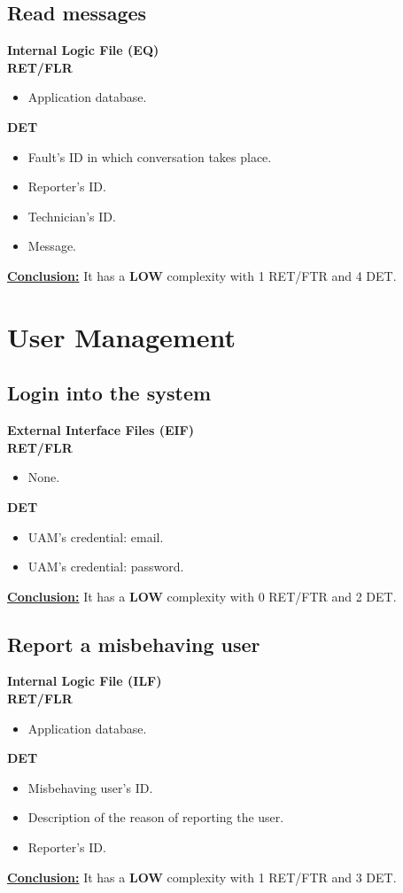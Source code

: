 \subsection{Read messages}
\textbf{Internal Logic File (EQ)} \\ 
\textbf{RET/FLR}
\begin{itemize}
\item Application database.
\end{itemize}
\textbf{DET}
\begin{itemize}
\item Fault's ID in which conversation takes place.
\item Reporter's ID.
\item Technician's ID.
\item Message.
\end{itemize}
\textbf{\underline{Conclusion:}} It has a \textbf{LOW} complexity with 1 RET/FTR and 4 DET.



\section{User Management}

\subsection{Login into the system}
\textbf{External Interface Files (EIF)} \\ 
\textbf{RET/FLR}
\begin{itemize}
\item None.
\end{itemize}
\textbf{DET}
\begin{itemize}
\item UAM's credential: email.
\item UAM's credential: password.
\end{itemize}
\textbf{\underline{Conclusion:}} It has a \textbf{LOW} complexity with 0 RET/FTR and 2 DET.

\subsection{Report a misbehaving user}
\textbf{Internal Logic File (ILF)} \\ 
\textbf{RET/FLR}
\begin{itemize}
\item Application database.
\end{itemize}
\textbf{DET}
\begin{itemize}
\item Misbehaving user's ID.
\item Description of the reason of reporting the user.
\item Reporter's ID.
\end{itemize}
\textbf{\underline{Conclusion:}} It has a \textbf{LOW} complexity with 1 RET/FTR and 3 DET.

